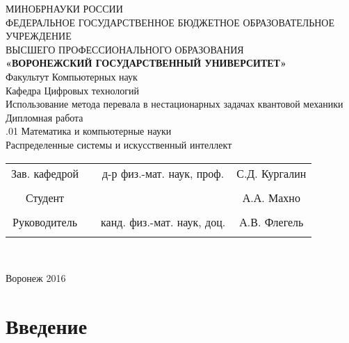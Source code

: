 \documentclass[14pt]{extarticle}
\begin{document}
\begin{center}
	\hfill \break
	\large{МИНОБРНАУКИ РОССИИ}\\
	\footnotesize{ФЕДЕРАЛЬНОЕ ГОСУДАРСТВЕННОЕ БЮДЖЕТНОЕ ОБРАЗОВАТЕЛЬНОЕ УЧРЕЖДЕНИЕ}\\
	\footnotesize{ВЫСШЕГО ПРОФЕССИОНАЛЬНОГО ОБРАЗОВАНИЯ}\\
	\small{\textbf{«ВОРОНЕЖСКИЙ ГОСУДАРСТВЕННЫЙ УНИВЕРСИТЕТ»}}\\
	\hfill \break
	\normalsize{Факультут Компьютерных наук}\\
	\hfill \break
	\normalsize{Кафедра Цифровых технологий}\\
	\hfill\break
	\hfill \break
	\hfill \break
	\hfill \break
	\large{Использование метода перевала в нестационарных задачах квантовой механики}\\
	\hfill \break
	\hfill \break
	\hfill \break
	\normalsize{Дипломная работа\\
		\hfill {}.01 Математика и компьютерные науки\\
		\hfill \break
		Распределенные системы и искусственный интеллект}\\
	\hfill \break
	\hfill \break
\end{center}

\hfill \break
\hfill \break

\normalsize{
	\begin{tabular}{cccc}
		Зав. кафедрой & \underline{\hspace{3cm}} &  д-р физ.-мат. наук,  проф. & С.Д. Кургалин \\\\
		Студент & \underline{\hspace{3cm}} & &А.А. Махно \\\\
		Руководитель & \underline{\hspace{3cm}}& канд. физ.-мат. наук, доц. &  А.В. Флегель \\\\
	\end{tabular}
}\\
\hfill \break
\hfill \break
\begin{center} Воронеж 2016 \end{center}
\thispagestyle{empty} %

\newpage	
\tableofcontents
\thispagestyle{empty} %
\newpage	
\section*{Введение}
\end{document}
